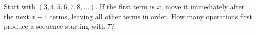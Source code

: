 Start with $(3,4,5,6,7,8,\ldots)$. If the first term is $x$, move it immediately after the next $x-1$ terms, leaving all other terms in order. How many operations first produce a sequence starting with 7?
